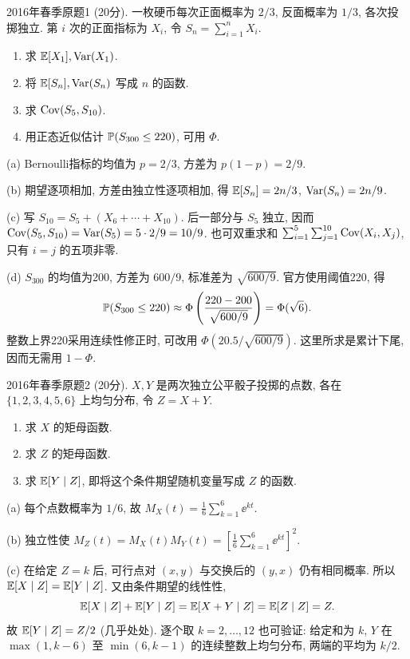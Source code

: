 \begin{exercise}\label{m2:2016s:q1}
2016年春季原题1 (20分). 一枚硬币每次正面概率为 $2/3$, 反面概率为 $1/3$, 各次投掷独立. 第 $i$ 次的正面指标为 $X_i$, 令 $S_n=\sum_{i=1}^nX_i$.
\begin{enumerate}
\item[(a)]\label{m2:2016s:q1:a} 求 $\mathbb E[X_1],\operatorname{Var}(X_1)$.
\item[(b)]\label{m2:2016s:q1:b} 将 $\mathbb E[S_n],\operatorname{Var}(S_n)$ 写成 $n$ 的函数.
\item[(c)]\label{m2:2016s:q1:c} 求 $\operatorname{Cov}(S_5,S_{10})$.
\item[(d)]\label{m2:2016s:q1:d} 用正态近似估计 $\mathbb P(S_{300}\le220)$, 可用 $\Phi$.
\end{enumerate}
\end{exercise}
\begin{solution}
(a) Bernoulli指标的均值为 $p=2/3$, 方差为 $p(1-p)=2/9$.

(b) 期望逐项相加, 方差由独立性逐项相加, 得 $\mathbb E[S_n]=2n/3$, $\operatorname{Var}(S_n)=2n/9$.

(c) 写 $S_{10}=S_5+(X_6+\cdots+X_{10})$. 后一部分与 $S_5$ 独立, 因而 $\operatorname{Cov}(S_5,S_{10})=\operatorname{Var}(S_5)=5\cdot2/9=10/9$. 也可双重求和 $\sum_{i=1}^5\sum_{j=1}^{10}\operatorname{Cov}(X_i,X_j)$, 只有 $i=j$ 的五项非零.

(d) $S_{300}$ 的均值为200, 方差为 $600/9$, 标准差为 $\sqrt{600/9}$. 官方使用阈值220, 得
\[
\mathbb P(S_{300}\le220)\approx\Phi\left(\frac{220-200}{\sqrt{600/9}}\right)=\Phi(\sqrt6).
\]
整数上界220采用连续性修正时, 可改用 $\Phi(20.5/\sqrt{600/9})$. 这里所求是累计下尾, 因而无需用 $1-\Phi$.
\end{solution}

\begin{exercise}\label{m2:2016s:q2}
2016年春季原题2 (20分). $X,Y$ 是两次独立公平骰子投掷的点数, 各在 $\{1,2,3,4,5,6\}$ 上均匀分布, 令 $Z=X+Y$.
\begin{enumerate}
\item[(a)]\label{m2:2016s:q2:a} 求 $X$ 的矩母函数.
\item[(b)]\label{m2:2016s:q2:b} 求 $Z$ 的矩母函数.
\item[(c)]\label{m2:2016s:q2:c} 求 $\mathbb E[Y\mid Z]$, 即将这个条件期望随机变量写成 $Z$ 的函数.
\end{enumerate}
\end{exercise}
\begin{solution}
(a) 每个点数概率为 $1/6$, 故 $M_X(t)=\frac16\sum_{k=1}^6\ee^{kt}$.

(b) 独立性使 $M_Z(t)=M_X(t)M_Y(t)=[\frac16\sum_{k=1}^6\ee^{kt}]^2$.

(c) 在给定 $Z=k$ 后, 可行点对 $(x,y)$ 与交换后的 $(y,x)$ 仍有相同概率. 所以 $\mathbb E[X\mid Z]=\mathbb E[Y\mid Z]$. 又由条件期望的线性性,
\[
\mathbb E[X\mid Z]+\mathbb E[Y\mid Z]=\mathbb E[X+Y\mid Z]=\mathbb E[Z\mid Z]=Z.
\]
故 $\mathbb E[Y\mid Z]=Z/2$ (几乎处处). 逐个取 $k=2,\ldots,12$ 也可验证: 给定和为 $k$, $Y$ 在 $\max(1,k-6)$ 至 $\min(6,k-1)$ 的连续整数上均匀分布, 两端的平均为 $k/2$.
\end{solution}

